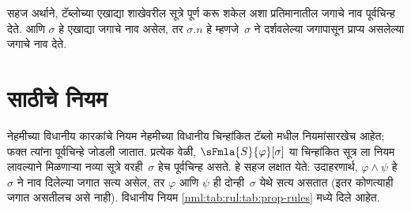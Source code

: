 सहज अर्थाने, टॅब्लोच्या एखाद्या शाखेवरील
सूत्रे पूर्ण करू शकेल अशा प्रतिमानातील
जगाचे नाव पूर्वचिन्ह देते. आणि $\sigma$ हे
एखाद्या जगाचे नाव असेल, तर $\sigma.n$ हे
म्हणजे~$\sigma$ ने दर्शवलेल्या जगापासून प्राप्य
असलेल्या जगाचे नाव देते.













\section{ साठीचे नियम}\label{nml:tab:rul:sec}

नेहमीच्या विधानीय कारकांचे नियम नेहमीच्या विधानीय
चिन्हांकित टॅब्लो मधील नियमांसारखेच आहेत;
फक्त त्यांना पूर्वचिन्हे जोडली जातात. प्रत्येक वेळी,
$\sFmla{S}{\varphi}[\sigma]$ या चिन्हांकित सूत्र
ला नियम लावल्याने मिळणाऱ्या नव्या सूत्रे
वरही~$\sigma$ हेच पूर्वचिन्ह असते. हे सहज लक्षात
येते: उदाहरणार्थ, $\varphi \land \psi$ हे~$\sigma$ ने
नाव दिलेल्या जगात सत्य असेल, तर $\varphi$ आणि $\psi$
ही दोन्ही~$\sigma$ येथे सत्य असतात (इतर कोणत्याही
जगात असतीलच असे नाही). विधानीय नियम
\ref{nml:tab:rul:tab:prop-rules} मध्ये दिले आहेत.

